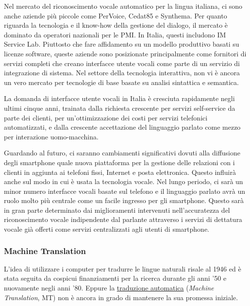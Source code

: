 \documentclass[]{../../metanetpaper}
\begin{document}
\begin{multicols}{2}
Nel mercato del riconoscimento vocale automatico per la lingua italiana, ci sono anche aziende pi\`{u} piccole come PerVoice, Cedat85 e Synthema. Per quanto riguarda la tecnologia e il know-how della gestione del dialogo, il mercato \`{e} dominato da operatori nazionali per le PMI. In Italia, questi includono IM Service Lab. Piuttosto che fare affidamento su un modello produttivo basati su licenze software, queste aziende sono posizionate principalmente come fornitori di servizi completi che creano interfacce utente vocali come parte di un servizio di integrazione di sistema. Nel settore della tecnologia interattiva, non vi \`{e} ancora un vero mercato per tecnologie di base basate su analisi sintattica e semantica.

La domanda di interfacce utente vocali in Italia \`{e} cresciuta rapidamente negli ultimi cinque anni, trainata dalla richiesta crescente per servizi self-service da parte dei clienti, per un'ottimizzazione dei costi per servizi telefonici automatizzati, e dalla crescente accettazione del linguaggio parlato come mezzo per interazione uomo-macchina.

Guardando al futuro, ci saranno cambiamenti significativi dovuti alla diffusione degli smartphone quale nuova piattaforma per la gestione delle relazioni con i clienti in aggiunta ai telefoni fissi, Internet e posta elettronica. Questo influir\`{a} anche sul modo in cui \`{e} usata la tecnologia vocale. Nel lungo periodo, ci sar\`{a} un minor numero interfacce vocali basate sul telefono e il linguaggio parlato avr\`{a} un ruolo molto pi\`{u} centrale come un facile ingresso per gli smartphone. Questo sar\`{a} in gran parte determinato dai miglioramenti intervenuti nell'accuratezza del riconoscimento vocale indipendente dal parlante attraverso i servizi di dettatura vocale gi\`{a} offerti come servizi centralizzati agli utenti di smartphone.



\subsubsection{Machine Translation}

L'idea di utilizzare i computer per tradurre le lingue naturali risale al 1946 ed \`{e} stata seguita da cospicui finanziamenti per la ricerca durante gli anni '50 e nuovamente negli anni '80. Eppure la \underline{traduzione automatica} (\emph{Machine Translation}, MT) non \`{e} ancora in grado di mantenere la sua promessa iniziale.



\end{multicols}
\end{document}
